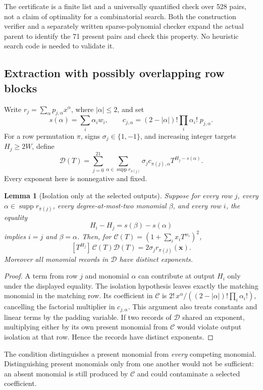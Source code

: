 \documentclass[11pt]{article}
\newtheorem{lemma}[theorem]{Lemma}
\theoremstyle{definition}\newtheorem{definition}[theorem]{Definition}
\theoremstyle{remark}\newtheorem{remark}[theorem]{Remark}
\begin{document}
The certificate is a finite list and a universally quantified check over
528 pairs, not a claim of optimality for a combinatorial search. Both the
construction verifier and a separately written sparse-polynomial checker
expand the actual parent to identify the 71 present pairs and check this
property. No heuristic search code is needed to validate it.

\subsection{Extraction with possibly overlapping row blocks}
Write $r_j=\sum_\alpha p_{j,\alpha}x^\alpha$, where $|\alpha|\le2$, and set
\[
 s(\alpha)=\sum_i\alpha_iw_i,\qquad
 c_{j,\alpha}=(2-|\alpha|)!\prod_i\alpha_i!\;p_{j,\alpha}.
\]
For a row permutation $\pi$, signs $\sigma_j\in\{1,-1\}$, and increasing
integer targets $H_j\ge2W$, define
\begin{equation}\label{eq:Dcode}
 \mathcal D(T)=\sum_{j=0}^{21}\sum_{\alpha\in\operatorname{supp}r_{\pi(j)}}
 \sigma_jc_{\pi(j),\alpha}T^{H_j-s(\alpha)}.
\end{equation}
Every exponent here is nonnegative and fixed.

\begin{lemma}[Isolation only at the selected outputs]\label{lem:isolation}
Suppose for every row $j$, every $\alpha\in\operatorname{supp}r_{\pi(j)}$,
every degree-at-most-two monomial $\beta$, and every row $i$, the equality
\[
 H_i-H_j=s(\beta)-s(\alpha)
\]
implies $i=j$ and $\beta=\alpha$. Then, for
$\mathcal C(T)=(1+\sum_i x_iT^{w_i})^2$,
\[
 [T^{H_j}]\,\mathcal C(T)\mathcal D(T)
       =2\sigma_jr_{\pi(j)}(\mathbf x).
\]
Moreover all monomial records in $\mathcal D$ have distinct exponents.
\end{lemma}
\begin{proof}
A term from row $j$ and monomial $\alpha$ can contribute at output $H_i$
only under the displayed equality. The isolation hypothesis leaves exactly
the matching monomial in the matching row. Its coefficient in $\mathcal C$
is $2!\,x^\alpha/((2-|\alpha|)!\prod_i\alpha_i!)$, cancelling the
factorial multiplier in $c_{j,\alpha}$. This argument also treats constants
and linear terms by the padding variable. If two records of $\mathcal D$
shared an exponent, multiplying either by its own present monomial from
$\mathcal C$ would violate output isolation at that row. Hence the records
have distinct exponents.
\end{proof}

The condition distinguishes a present monomial from \emph{every} competing
monomial. Distinguishing present monomials only from one another would not
be sufficient: an absent monomial is still produced by $\mathcal C$ and
could contaminate a selected coefficient.
\end{document}
